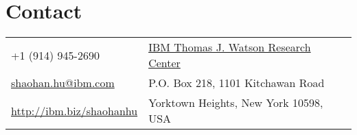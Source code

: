 
\section{\sc Contact}
\vspace{.01in}
\begin{tabular}{@{}p{3.3in}p{4in}}
+1 (914) 945-2690  & {\href{http://research.ibm.com/labs/watson/index.shtml}{IBM Thomas J. Watson Research Center}} \\
{\href{mailto:shaohan.hu@ibm.com}{shaohan.hu@ibm.com}} & {P.O. Box 218, 1101 Kitchawan Road} \\
{\url{http://ibm.biz/shaohanhu}} & Yorktown Heights, New York 10598, USA \\
\end{tabular}

